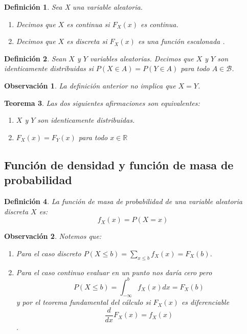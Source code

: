 \documentclass[14pt]{extarticle}
\newtheorem{theorem}{Teorema}[section]
\newtheorem{definition}[theorem]{Definición}
\newtheorem{remark}{Observación}[section]
\begin{document}
\begin{definition}
    Sea X una variable aleatoria. 
    \begin{enumerate}
        \item Decimos que $X$ es continua si $F_X(x)$ es continua.
        \item Decimos que $X$ es discreta si $F_X(x)$ es una función escalonada .
    \end{enumerate}
\end{definition}

\begin{definition}
    Sean $X$ y $Y$ variables aleatorias. Decimos que $X$ y $Y$ son identicamente distribuidas si $P(X \in A) = P(Y \in A)$
     para todo $A \in \mathcal{B}$.
\end{definition}

\begin{remark}
    La definición anterior no implica que $X = Y$.
\end{remark}

\begin{theorem}
    Las dos siguientes afirmaciones son equivalentes:
    \begin{enumerate}
        \item $X$ y $Y$ son identicamente distribuidas.
        \item $F_X(x) = F_Y(x)$ para todo $x \in \mathbb{R}$
    \end{enumerate}
\end{theorem}

\subsection{Función de densidad y función de masa de probabilidad}
\begin{definition}
    La función de masa de probabilidad de una variable aleatoria discreta $X$ es:
    \[
        f_X(x) = P(X = x)
    \]
\end{definition}

\begin{remark}
    Notemos que:
    \begin{enumerate}
        \item Para el caso discreto $P(X \leq b) = \sum_{x \leq b} f_X(x) = F_X(b)$.
        \item Para el caso continuo evaluar en un punto nos daría cero pero
         $$P(X \leq b) = \int_{-\infty}^b f_X(x) dx = F_X(b)$$ y por el teorema fundamental del cálculo si $F_X(x)$
          es diferenciable
         $$\frac{d}{dx} F_X(x) = f_X(x)$$. 
    \end{enumerate}
\end{remark}
\end{document}
